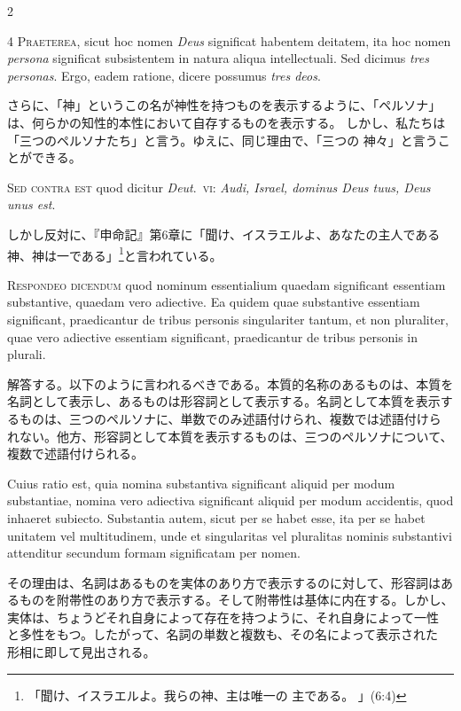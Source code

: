 \documentclass[paper=a4paper,fontsize=10pt,jafontsize=9pt,titlepage]{jlreq}
\begin{document}
\begin{paracol}{2}
\switchcolumn*

4 {\scshape Praeterea}, sicut hoc nomen {\itshape Deus} significat habentem deitatem, ita hoc
nomen {\itshape persona} significat subsistentem in natura aliqua
intellectuali. Sed dicimus {\itshape tres personas}. Ergo, eadem ratione, dicere
possumus {\itshape tres deos}.

\switchcolumn

さらに、「神」というこの名が神性を持つものを表示するように、「ペルソナ」
 は、何らかの知性的本性において自存するものを表示する。
しかし、私たちは「三つのペルソナたち」と言う。ゆえに、同じ理由で、「三つの
 神々」と言うことができる。

\switchcolumn*

{\scshape Sed contra est} quod dicitur {\itshape Deut}.~{\scshape vi}: {\itshape Audi, Israel, dominus Deus tuus,
Deus unus est}.

\switchcolumn

しかし反対に、『申命記』第6章に「聞け、イスラエルよ、あなたの主人である
 神、神は一である」\footnote{「聞け、イスラエルよ。我らの神、主は唯一の
 主である。 」(6:4)}と言われている。

\switchcolumn*

{\scshape Respondeo dicendum} quod nominum essentialium quaedam significant
essentiam substantive, quaedam vero adiective. Ea quidem quae
substantive essentiam significant, praedicantur de tribus personis
singulariter tantum, et non pluraliter, quae vero adiective essentiam
significant, praedicantur de tribus personis in plurali.

\switchcolumn

解答する。以下のように言われるべきである。本質的名称のあるものは、本質を
名詞として表示し、あるものは形容詞として表示する。名詞として本質を表示す
 るものは、三つのペルソナに、単数でのみ述語付けられ、複数では述語付けら
 れない。他方、形容詞として本質を表示するものは、三つのペルソナについて、
 複数で述語付けられる。

\switchcolumn*

Cuius ratio
est, quia nomina substantiva significant aliquid per modum substantiae,
nomina vero adiectiva significant aliquid per modum accidentis, quod
inhaeret subiecto. Substantia autem, sicut per se habet esse, ita per se
habet unitatem vel multitudinem, unde et singularitas vel pluralitas
nominis substantivi attenditur secundum formam significatam per
nomen.

\switchcolumn

その理由は、名詞はあるものを実体のあり方で表示するのに対して、形容詞はあ
 るものを附帯性のあり方で表示する。そして附帯性は基体に内在する。しかし、
 実体は、ちょうどそれ自身によって存在を持つように、それ自身によって一性
 と多性をもつ。したがって、名詞の単数と複数も、その名によって表示された
 形相に即して見出される。


\end{paracol}
\end{document}
